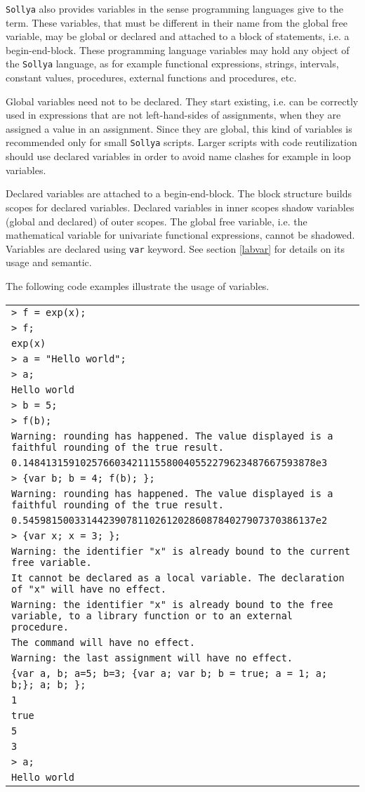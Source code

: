 \documentclass[a4paper]{article}
\newcommand{\key}[1]{\texttt{#1}}
\newcommand{\sollya}{\texttt{Sollya}\xspace}
\newcommand{\code}[1]{
\begin{center}
\begin{tabular}{|p{14.8cm}|}
\hline
#1
\hline
\end{tabular}
\end{center}
}
\newcommand{\ligne}[1]{\texttt{#1}\\}
\begin{document}
\sollya also provides variables in the sense programming languages
give to the term.  These variables, that must be different in their
name from the global free variable, may be global or declared and
attached to a block of statements, i.e. a begin-end-block. These
programming language variables may hold any object of the \sollya
language, as for example functional expressions, strings, intervals,
constant values, procedures, external functions and procedures, etc.

Global variables need not to be declared. They start existing,
i.e. can be correctly used in expressions that are not left-hand-sides
of assignments, when they are assigned a value in an assignment. Since
they are global, this kind of variables is recommended only for small
\sollya scripts.  Larger scripts with code reutilization should use
declared variables in order to avoid name clashes for example in loop
variables.

Declared variables are attached to a begin-end-block. The block
structure builds scopes for declared variables. Declared variables in
inner scopes shadow variables (global and declared) of outer
scopes. The global free variable, i.e. the mathematical variable for
univariate functional expressions, cannot be shadowed. Variables are
declared using \key{var} keyword. See section \ref{labvar} for details
on its usage and semantic.

The following code examples illustrate the usage of variables.


\code{
\ligne{> f = exp(x);}
\ligne{> f;}
\ligne{exp(x)}
\ligne{> a = "Hello world";}
\ligne{> a;}
\ligne{Hello world}
\ligne{> b = 5;}
\ligne{> f(b);}
\ligne{Warning: rounding has happened. The value displayed is a faithful rounding of the true result.}
\ligne{0.148413159102576603421115580040552279623487667593878e3}
\ligne{> \{var b; b = 4; f(b); \};}
\ligne{Warning: rounding has happened. The value displayed is a faithful rounding of the true result.}
\ligne{0.545981500331442390781102612028608784027907370386137e2}
\ligne{> \{var x; x = 3; \};}
\ligne{Warning: the identifier "x" is already bound to the current free variable.}
\ligne{It cannot be declared as a local variable. The declaration of "x" will have no effect.}
\ligne{Warning: the identifier "x" is already bound to the free variable, to a library function or to an external procedure.}
\ligne{The command will have no effect.}
\ligne{Warning: the last assignment will have no effect.}
\ligne{\{var a, b; a=5; b=3; \{var a; var b; b = true; a = 1; a; b;\}; a; b; \};}
\ligne{1}
\ligne{true}
\ligne{5}
\ligne{3}
\ligne{> a;}
\ligne{Hello world}
}
\end{document}
